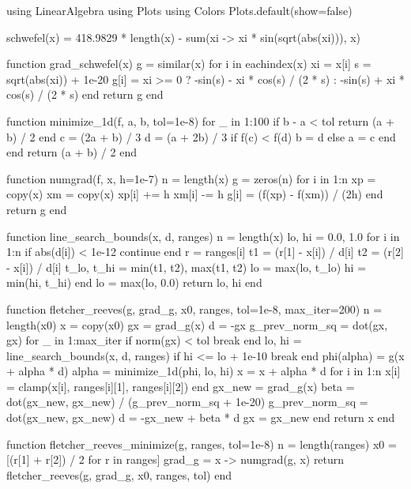 \documentclass[a4paper, 14pt]{extarticle}
\begin{document}
\begin{breakablelisting}
using LinearAlgebra
using Plots
using Colors
Plots.default(show=false)

schwefel(x) = 418.9829 * length(x) - sum(xi -> xi * sin(sqrt(abs(xi))), x)

function grad_schwefel(x)
    g = similar(x)
    for i in eachindex(x)
        xi = x[i]
        s = sqrt(abs(xi)) + 1e-20
        g[i] = xi >= 0 ? -sin(s) - xi * cos(s) / (2 * s) : -sin(s) + xi * cos(s) / (2 * s)
    end
    return g
end

function minimize_1d(f, a, b, tol=1e-8)
    for _ in 1:100
        if b - a < tol
            return (a + b) / 2
        end
        c = (2a + b) / 3
        d = (a + 2b) / 3
        if f(c) < f(d)
            b = d
        else
            a = c
        end
    end
    return (a + b) / 2
end

function numgrad(f, x, h=1e-7)
    n = length(x)
    g = zeros(n)
    for i in 1:n
        xp = copy(x)
        xm = copy(x)
        xp[i] += h
        xm[i] -= h
        g[i] = (f(xp) - f(xm)) / (2h)
    end
    return g
end

function line_search_bounds(x, d, ranges)
    n = length(x)
    lo, hi = 0.0, 1.0
    for i in 1:n
        if abs(d[i]) < 1e-12
            continue
        end
        r = ranges[i]
        t1 = (r[1] - x[i]) / d[i]
        t2 = (r[2] - x[i]) / d[i]
        t_lo, t_hi = min(t1, t2), max(t1, t2)
        lo = max(lo, t_lo)
        hi = min(hi, t_hi)
    end
    lo = max(lo, 0.0)
    return lo, hi
end

function fletcher_reeves(g, grad_g, x0, ranges, tol=1e-8, max_iter=200)
    n = length(x0)
    x = copy(x0)
    gx = grad_g(x)
    d = -gx
    g_prev_norm_sq = dot(gx, gx)
    for _ in 1:max_iter
        if norm(gx) < tol
            break
        end
        lo, hi = line_search_bounds(x, d, ranges)
        if hi <= lo + 1e-10
            break
        end
        phi(alpha) = g(x + alpha * d)
        alpha = minimize_1d(phi, lo, hi)
        x = x + alpha * d
        for i in 1:n
            x[i] = clamp(x[i], ranges[i][1], ranges[i][2])
        end
        gx_new = grad_g(x)
        beta = dot(gx_new, gx_new) / (g_prev_norm_sq + 1e-20)
        g_prev_norm_sq = dot(gx_new, gx_new)
        d = -gx_new + beta * d
        gx = gx_new
    end
    return x
end

function fletcher_reeves_minimize(g, ranges, tol=1e-8)
    n = length(ranges)
    x0 = [(r[1] + r[2]) / 2 for r in ranges]
    grad_g = x -> numgrad(g, x)
    return fletcher_reeves(g, grad_g, x0, ranges, tol)
end


\end{breakablelisting}
\end{document}
